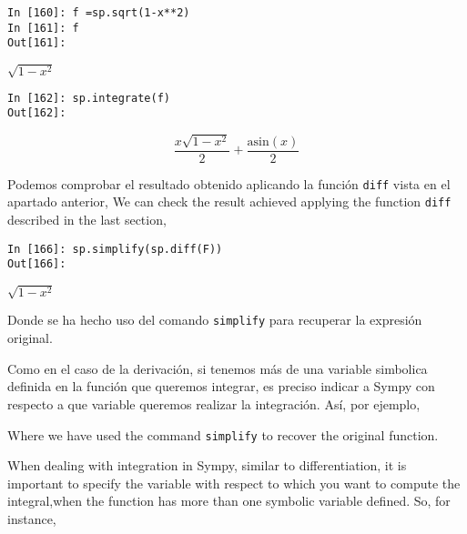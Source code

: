 \begin{center}
	\begin{minipage}{.5\textwidth}
		\begin{verbatim}
In [160]: f =sp.sqrt(1-x**2)
In [161]: f
Out[161]: 
			\end{verbatim}
		$\sqrt{1-x^2}$
		\begin{verbatim}
In [162]: sp.integrate(f)
Out[162]: 
		\end{verbatim}
		\begin{equation*}
			\frac{x\sqrt{1-x^2}}{2}+\frac{\text{asin}(x)}{2}
		\end{equation*}
	\end{minipage}
\end{center}
\begin{paracol}{2}
Podemos comprobar el resultado obtenido aplicando la función \texttt{diff} vista en el apartado anterior,
\switchcolumn
We can check the result achieved applying the function \texttt{diff} described in the last section,
\end{paracol}
\begin{center}
	\begin{minipage}{.5\textwidth}
		\begin{verbatim}
In [166]: sp.simplify(sp.diff(F))
Out[166]:  
		\end{verbatim}
			$\sqrt{1-x^2}$
	\end{minipage}
\end{center}
\begin{paracol}{2}
Donde se ha hecho uso del comando \texttt{simplify} para recuperar la expresión original.

Como en el caso de la derivación, si tenemos más de una variable simbolica definida en la función que queremos integrar, es preciso indicar a Sympy con respecto a que variable queremos realizar la integración. Así, por ejemplo,

\switchcolumn
Where we have used the command \texttt{simplify} to recover the original function.

When dealing with integration in Sympy, similar to differentiation, it is important to specify the variable with respect to which you want to compute the integral,when the function has more than one symbolic variable defined. So, for instance,
\end{paracol}
